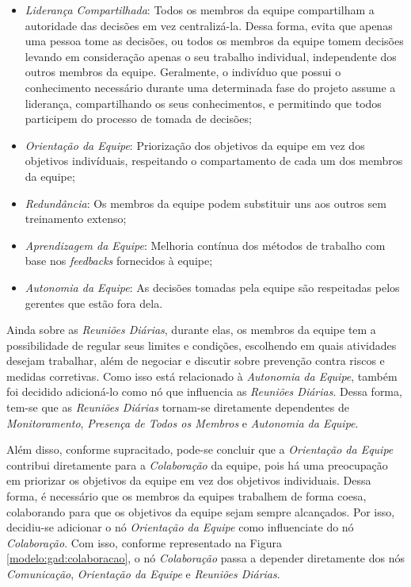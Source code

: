 \begin{itemize}
  \item \textit{Liderança Compartilhada}: Todos os membros da equipe compartilham a autoridade das decisões em vez centralizá-la. Dessa forma, evita que apenas uma pessoa tome as decisões, ou todos os membros da equipe tomem decisões levando em consideração apenas o seu trabalho individual, independente dos outros membros da equipe. Geralmente, o indivíduo que possui o conhecimento necessário durante uma determinada fase do projeto assume a liderança, compartilhando os seus conhecimentos, e permitindo que todos participem do processo de tomada de decisões;
  \item \textit{Orientação da Equipe}: Priorização dos objetivos da equipe em vez dos objetivos indivíduais, respeitando o compartamento de cada um dos membros da equipe;
  \item \textit{Redundância}: Os membros da equipe podem substituir uns aos outros sem treinamento extenso;
  \item \textit{Aprendizagem da Equipe}: Melhoria contínua dos métodos de trabalho com base nos \textit{feedbacks} fornecidos à equipe;
  \item \textit{Autonomia da Equipe}: As decisões tomadas pela equipe são respeitadas pelos gerentes que estão fora dela.
\end{itemize}

Ainda sobre as \textit{Reuniões Diárias}, durante elas, os membros da equipe tem a possibilidade de regular seus limites e condições, escolhendo em quais atividades desejam trabalhar, além de negociar e discutir sobre prevenção contra riscos e medidas corretivas. Como isso está relacionado à \textit{Autonomia da Equipe}, também foi decidido adicioná-lo como nó que influencia as \textit{Reuniões Diárias}. Dessa forma, tem-se que as \textit{Reuniões Diárias} tornam-se diretamente dependentes de \textit{Monitoramento}, \textit{Presença de Todos os Membros} e \textit{Autonomia da Equipe}.

Além disso, conforme supracitado, pode-se concluir que a \textit{Orientação da Equipe} contribui diretamente para a \textit{Colaboração} da equipe, pois há uma preocupação em priorizar os objetivos da equipe em vez dos objetivos individuais. Dessa forma, é necessário que os membros da equipes trabalhem de forma coesa, colaborando para que os objetivos da equipe sejam sempre alcançados. Por isso, decidiu-se adicionar o nó \textit{Orientação da Equipe} como influenciate do nó \textit{Colaboração}. Com isso, conforme representado na Figura \ref{modelo:gad:colaboracao}, o nó \textit{Colaboração} passa a depender diretamente dos nós \textit{Comunicação}, \textit{Orientação da Equipe} e \textit{Reuniões Diárias}.

